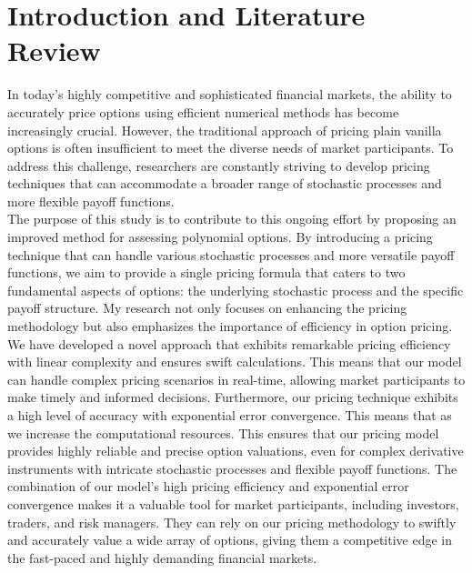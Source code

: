 
\chapter{Introduction and Literature Review}

In today's highly competitive and sophisticated financial markets, the ability to accurately price options using efficient numerical methods has become increasingly crucial. However, the traditional approach of pricing plain vanilla options is often insufficient to meet the diverse needs of market participants. To address this challenge, researchers are constantly striving to develop pricing techniques that can accommodate a broader range of stochastic processes and more flexible payoff functions.\\

The purpose of this study is to contribute to this ongoing effort by proposing an improved method for assessing polynomial options. By introducing a pricing technique that can handle various stochastic processes and more versatile payoff functions, we aim to provide a single pricing formula that caters to two fundamental aspects of options: the underlying stochastic process and the specific payoff structure. My research not only focuses on enhancing the pricing methodology but also emphasizes the importance of efficiency in option pricing. We have developed a novel approach that exhibits remarkable pricing efficiency with linear complexity and ensures swift calculations. This means that our model can handle complex pricing scenarios in real-time, allowing market participants to make timely and informed decisions. Furthermore, our pricing technique exhibits a high level of accuracy with exponential error convergence. This means that as we increase the computational resources. This ensures that our pricing model provides highly reliable and precise option valuations, even for complex derivative instruments with intricate stochastic processes and flexible payoff functions. The combination of our model's high pricing efficiency and exponential error convergence makes it a valuable tool for market participants, including investors, traders, and risk managers. They can rely on our pricing methodology to swiftly and accurately value a wide array of options, giving them a competitive edge in the fast-paced and highly demanding financial markets. \\

